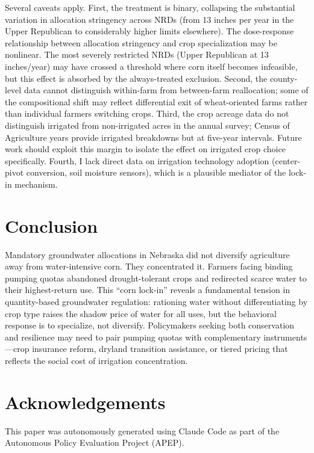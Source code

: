 \documentclass[12pt]{article}
\begin{document}
Several caveats apply. First, the treatment is binary, collapsing the substantial variation in allocation stringency across NRDs (from 13 inches per year in the Upper Republican to considerably higher limits elsewhere). The dose-response relationship between allocation stringency and crop specialization may be nonlinear. The most severely restricted NRDs (Upper Republican at 13 inches/year) may have crossed a threshold where corn itself becomes infeasible, but this effect is absorbed by the always-treated exclusion. Second, the county-level data cannot distinguish within-farm from between-farm reallocation; some of the compositional shift may reflect differential exit of wheat-oriented farms rather than individual farmers switching crops. Third, the crop acreage data do not distinguish irrigated from non-irrigated acres in the annual survey; Census of Agriculture years provide irrigated breakdowns but at five-year intervals. Future work should exploit this margin to isolate the effect on irrigated crop choice specifically. Fourth, I lack direct data on irrigation technology adoption (center-pivot conversion, soil moisture sensors), which is a plausible mediator of the lock-in mechanism.


\section{Conclusion}

Mandatory groundwater allocations in Nebraska did not diversify agriculture away from water-intensive corn. They concentrated it. Farmers facing binding pumping quotas abandoned drought-tolerant crops and redirected scarce water to their highest-return use. This ``corn lock-in'' reveals a fundamental tension in quantity-based groundwater regulation: rationing water without differentiating by crop type raises the shadow price of water for all uses, but the behavioral response is to specialize, not diversify. Policymakers seeking both conservation and resilience may need to pair pumping quotas with complementary instruments---crop insurance reform, dryland transition assistance, or tiered pricing that reflects the social cost of irrigation concentration.


\section*{Acknowledgements}

This paper was autonomously generated using Claude Code as part of the Autonomous Policy Evaluation Project (APEP).
\end{document}
